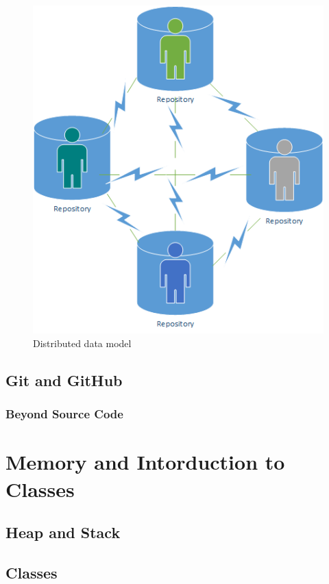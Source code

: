 \documentclass[
]{book}
\begin{document}
\begin{figure}

{\centering \includegraphics[width=0.6\linewidth]{images/Distributed Data Model Example} 

}

\caption{Distributed data model}\label{fig:unnamed-chunk-4}
\end{figure}

\hypertarget{git-and-github}{%
\section{Git and GitHub}\label{git-and-github}}

\hypertarget{beyond-source-code}{%
\subsection{Beyond Source Code}\label{beyond-source-code}}

\hypertarget{memory-and-intorduction-to-classes}{%
\chapter{Memory and Intorduction to Classes}\label{memory-and-intorduction-to-classes}}

\hypertarget{heap-and-stack}{%
\section{Heap and Stack}\label{heap-and-stack}}

\hypertarget{classes}{%
\section{Classes}\label{classes}}
\end{document}
